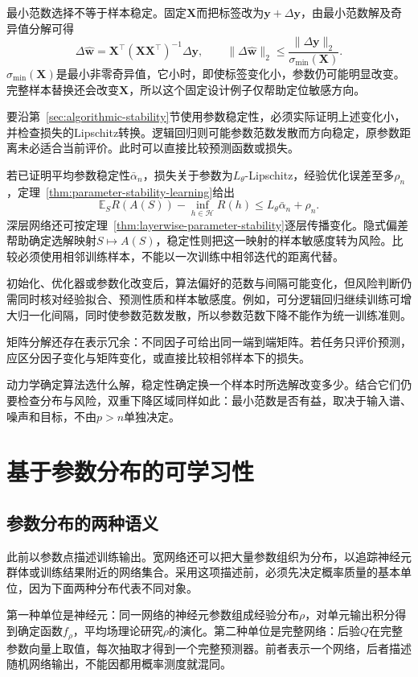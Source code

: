 最小范数选择不等于样本稳定。固定$\bm X$而把标签改为$\bm y+\Delta\bm y$，由最小范数解及奇异值分解可得
\[
 \Delta\hat{\bm w}=\bm X^\top(\bm X\bm X^\top)^{-1}\Delta\bm y,
 \qquad
 \|\Delta\hat{\bm w}\|_2\leq
 \frac{\|\Delta\bm y\|_2}{\sigma_{\min}(\bm X)}.
\]
$\sigma_{\min}(\bm X)$是最小非零奇异值，它小时，即使标签变化小，参数仍可能明显改变。完整样本替换还会改变$\bm X$，所以这个固定设计例子仅帮助定位敏感方向。

要沿第~\ref{sec:algorithmic-stability}节使用参数稳定性，必须实际证明上述变化小，并检查损失的Lipschitz转换。逻辑回归则可能参数范数发散而方向稳定，原参数距离未必适合当前评价。此时可以直接比较预测函数或损失。

若已证明平均参数稳定性$\bar\alpha_n$，损失关于参数为$L_\theta$-Lipschitz，经验优化误差至多$\rho_n$，定理~\ref{thm:parameter-stability-learning}给出
\[
 \mathbb E_S R(A(S))-\inf_{h\in\mathcal H}R(h)
 \leq L_\theta\bar\alpha_n+\rho_n.
\]
深层网络还可按定理~\ref{thm:layerwise-parameter-stability}逐层传播变化。隐式偏差帮助确定选解映射$S\mapsto A(S)$，稳定性则把这一映射的样本敏感度转为风险。比较必须使用相邻训练样本，不能以一次训练中相邻迭代的距离代替。

初始化、优化器或参数化改变后，算法偏好的范数与间隔可能变化，但风险判断仍需同时核对经验拟合、预测性质和样本敏感度。例如，可分逻辑回归继续训练可增大归一化间隔，同时使参数范数发散，所以参数范数下降不能作为统一训练准则。

矩阵分解还存在表示冗余：不同因子可给出同一端到端矩阵。若任务只评价预测，应区分因子变化与矩阵变化，或直接比较相邻样本下的损失。

动力学确定算法选什么解，稳定性确定换一个样本时所选解改变多少。结合它们仍要检查分布与风险，双重下降区域同样如此：最小范数是否有益，取决于输入谱、噪声和目标，不由$p>n$单独决定。

\section{基于参数分布的可学习性}
\label{sec:parameter-distributions}

\subsection{参数分布的两种语义}

此前以参数点描述训练输出。宽网络还可以把大量参数组织为分布，以追踪神经元群体或训练结果附近的网络集合。采用这项描述前，必须先决定概率质量的基本单位，因为下面两种分布代表不同对象。

第一种单位是神经元：同一网络的神经元参数组成经验分布$\rho$，对单元输出积分得到确定函数$f_\rho$，平均场理论研究$\rho$的演化。第二种单位是完整网络：后验$Q$在完整参数向量上取值，每次抽取才得到一个完整预测器。前者表示一个网络，后者描述随机网络输出，不能因都用概率测度就混同。

